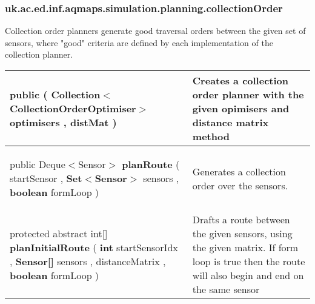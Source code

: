 \subsubsection*{ uk.ac.ed.inf.aqmaps.simulation.planning.collectionOrder }
 {\scriptsize Collection order planners generate good traversal orders between the given set of sensors,\newline%
 where "good" criteria are defined by each implementation of the collection planner.
 
\vspace*{-5pt} 
\begin{tabularx}{\linewidth}{X|m{}}
\label{tab:BaseCollectionOrderPlanner}
\begin{raggedleft}public  \textbf{\hyperref[tab:BaseCollectionOrderPlanner]{\color{blue}{BaseCollectionOrderPlanner}} }(\newline \hfill 
\hspace*{ 5pt} \textbf{Collection$<$CollectionOrderOptimiser$>$} optimisers , \newline
 \hspace*{ 5pt} \textbf{\hyperref[tab:DistanceMatrix]{\color{blue}{DistanceMatrix}}} distMat  )
\end{raggedleft} &
 Creates a collection order planner with the given opimisers and distance matrix method\\ \hline 
\begin{raggedleft}public Deque$<$Sensor$>$ \textbf{planRoute }(\newline \hfill 
\hspace*{ 5pt} \textbf{\hyperref[tab:Sensor]{\color{blue}{Sensor}}} startSensor , \newline
 \hspace*{ 5pt} \textbf{Set$<$Sensor$>$} sensors , \newline
 \hspace*{ 5pt} \textbf{boolean} formLoop  )
\end{raggedleft} &
 Generates a collection order over the sensors.\\ \hline 
\begin{raggedleft}protected abstract int{[}{]} \textbf{planInitialRoute }(\newline \hfill 
\hspace*{ 5pt} \textbf{int} startSensorIdx , \newline
 \hspace*{ 5pt} \textbf{Sensor{[}{]}} sensors , \newline
 \hspace*{ 5pt} \textbf{\hyperref[tab:DistanceMatrix]{\color{blue}{DistanceMatrix}}} distanceMatrix , \newline
 \hspace*{ 5pt} \textbf{boolean} formLoop  )
\end{raggedleft} &
 Drafts a route between the given sensors, using the given matrix. If form loop is true then the route will also begin and end on the same sensor\\\end{tabularx}
}
